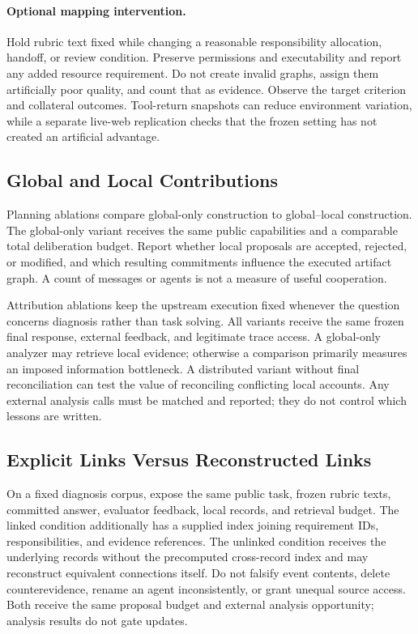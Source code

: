 \paragraph{Optional mapping intervention.}
Hold rubric text fixed while changing a reasonable responsibility allocation, handoff, or review condition. Preserve permissions and executability and report any added resource requirement. Do not create invalid graphs, assign them artificially poor quality, and count that as evidence. Observe the target criterion and collateral outcomes. Tool-return snapshots can reduce environment variation, while a separate live-web replication checks that the frozen setting has not created an artificial advantage.

\subsection{Global and Local Contributions}

Planning ablations compare global-only construction to global--local construction. The global-only variant receives the same public capabilities and a comparable total deliberation budget. Report whether local proposals are accepted, rejected, or modified, and which resulting commitments influence the executed artifact graph. A count of messages or agents is not a measure of useful cooperation.

Attribution ablations keep the upstream execution fixed whenever the question concerns diagnosis rather than task solving. All variants receive the same frozen final response, external feedback, and legitimate trace access. A global-only analyzer may retrieve local evidence; otherwise a comparison primarily measures an imposed information bottleneck. A distributed variant without final reconciliation can test the value of reconciling conflicting local accounts. Any external analysis calls must be matched and reported; they do not control which lessons are written.

\subsection{Explicit Links Versus Reconstructed Links}
\label{app:links}

On a fixed diagnosis corpus, expose the same public task, frozen rubric texts, committed answer, evaluator feedback, local records, and retrieval budget. The linked condition additionally has a supplied index joining requirement IDs, responsibilities, and evidence references. The unlinked condition receives the underlying records without the precomputed cross-record index and may reconstruct equivalent connections itself. Do not falsify event contents, delete counterevidence, rename an agent inconsistently, or grant unequal source access. Both receive the same proposal budget and external analysis opportunity; analysis results do not gate updates.

